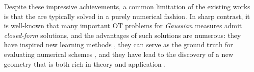 

Despite these impressive achievements, a common limitation of the existing works is that the  are typically solved in a purely {numerical} fashion. In sharp contrast, it is well-known that many important \acrshort{OT} problems for \emph{Gaussian} measures admit \emph{closed-form} solutions, and the advantages of such solutions are numerous: they have inspired new learning methods \citep{rabin2011wasserstein, vayer2019sliced, bonneel2015sliced}, they can serve as the ground truth for evaluating numerical schemes \citep{janati2020entropic}, and they have lead to the discovery of a new geometry that is both rich in theory and application \citep{takatsu2010wasserstein}. 

